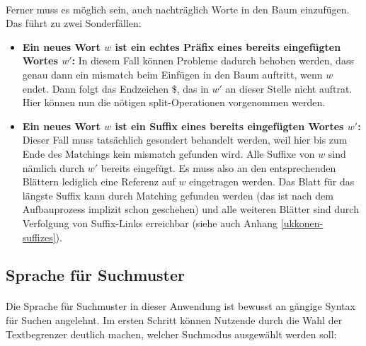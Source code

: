 \paragraph{} Ferner muss es möglich sein, auch nachträglich Worte in den Baum einzufügen. Das führt zu zwei  Sonderfällen:
\begin{itemize}
 \item \textbf{Ein neues Wort $w$ ist ein echtes Präfix eines bereits eingefügten Wortes $w'$:} In diesem Fall können Probleme dadurch behoben werden, dass genau dann ein mismatch beim Einfügen in den Baum auftritt, wenn $w$ endet. Dann folgt das Endzeichen $\$$, das in $w'$ an dieser Stelle nicht auftrat. Hier können nun die nötigen split-Operationen vorgenommen werden.
 \item \textbf{Ein neues Wort $w$ ist ein Suffix eines bereits eingefügten Wortes $w'$:} Dieser Fall muss tatsächlich gesondert behandelt werden, weil hier bis zum Ende des Matchings kein mismatch gefunden wird. Alle Suffixe von $w$ sind nämlich durch $w'$ bereits eingefügt. Es muss also an den entsprechenden Blättern lediglich eine Referenz auf $w$ eingetragen werden. Das Blatt für das längste Suffix kann durch Matching gefunden werden (das ist nach dem Aufbauprozess implizit schon geschehen) und alle weiteren Blätter sind durch Verfolgung von Suffix-Links erreichbar (siehe auch Anhang  \ref{ukkonen-suffizes}).
\end{itemize}

\subsection{Sprache für Suchmuster}
\label{algo-pattern-language}

\paragraph{} Die Sprache für Suchmuster in dieser Anwendung ist bewusst an gängige Syntax für Suchen angelehnt. Im ersten Schritt können Nutzende durch die Wahl der Textbegrenzer deutlich machen, welcher Suchmodus ausgewählt werden soll:

